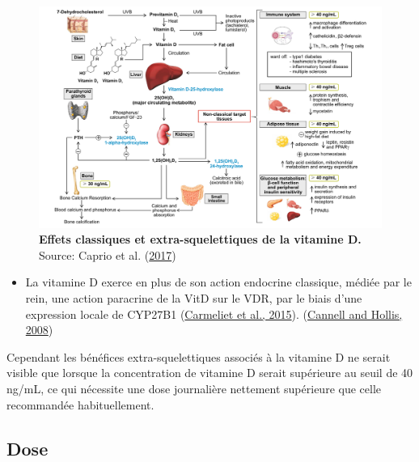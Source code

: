 \documentclass[
  letterpaper,
  DIV=11,
  numbers=noendperiod]{scrartcl}
\providecommand{\tightlist}{%
  \setlength{\itemsep}{0pt}\setlength{\parskip}{0pt}}\usepackage{longtable,booktabs,array}
\begin{document}
\begin{figure}

{\centering \includegraphics{figures/extra-skeletal-effect.png}

}

\caption{\label{fig-extra-skeletal}\textbf{Effets classiques et
extra-squelettiques de la vitamine D.} Source: Caprio et al.
(\protect\hyperlink{ref-Caprio.2017}{2017})}

\end{figure}

\begin{itemize}
\tightlist
\item
  La vitamine D exerce en plus de son action endocrine classique, médiée
  par le rein, une action paracrine de la VitD sur le VDR, par le biais
  d'une expression locale de CYP27B1
  (\protect\hyperlink{ref-Carmeliet.2015}{Carmeliet et al., 2015}).
  (\protect\hyperlink{ref-Cannell.2008}{Cannell and Hollis, 2008})
\end{itemize}

Cependant les bénéfices extra-squelettiques associés à la vitamine D ne
serait visible que lorsque la concentration de vitamine D serait
supérieure au seuil de 40 ng/mL, ce qui nécessite une dose journalière
nettement supérieure que celle recommandée habituellement.

\hypertarget{dose}{%
\subsection{Dose}\label{dose}}
\end{document}
